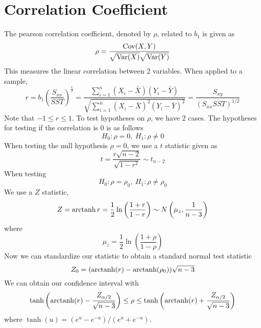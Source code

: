 \section{Correlation Coefficient}

The pearson correlation coefficient, denoted by $\rho$, related to $b_1$ is given as
\[\rho = \frac{\operatorname{Cov}(X,Y)}{\sqrt{\operatorname{Var}(X)}\sqrt{\operatorname{Var}(Y)}}\]
This measures the linear correlation between 2 variables. When applied to a sample, 
\[r = b_1\left(\frac{S_{xx}}{SST}\right)^{\frac{1}{2}} = \frac{\sum_{i=1}^n(X_i - \bar{X})(Y_i - \bar{Y})}{\sqrt{\sum_{i=1}^n (X_i - \bar{X})^2(Y_i - \bar{Y})^2}} = \frac{S_{xy}}{(S_{xx}SST)^{1/2}}\]
Note that $-1 \leq r \leq 1$. To test hypotheses on $\rho$, we have 2 cases. The hypotheses for testing if the correlation is 0 is as follows 
\[H_0: \rho = 0, \ H_1: \rho \neq 0\]
When testing the null hypothesis $\rho = 0$, we use a $t$ statistic given as 
\[t = \frac{r\sqrt{n-2}}{\sqrt{1-r^2}} \sim t_{n-2}\]
When testing 
\[H_0: \rho = \rho_0, \ H_1: \rho \neq \rho_0\]
We use a $Z$ statistic, 
\[Z = \operatorname{arctanh} r = \frac{1}{2}\ln \left(\frac{1+r}{1-r}\right) \sim N\left(\mu_z, \frac{1}{n-3}\right)\]
where 
\[\mu_z = \frac{1}{2}\ln\left(\frac{1+\rho}{1 - \rho}\right)\]
Now we can standardize our statistic to obtain a standard normal test statistic
\[Z_0 = (\operatorname{arctanh}(r) - \operatorname{arctanh}(\rho_0))\sqrt{n-3}\]
We can obtain our confidence interval with 
\[\tanh\left(\operatorname{arctanh}(r) - \frac{Z_{\alpha/2}}{\sqrt{n-3}}\right) \leq \rho \leq \tanh\left(\operatorname{arctanh}(r) + \frac{Z_{\alpha/2}}{\sqrt{n-3}}\right)\]
where $\tanh(u) = (e^u-e^{-u})/(e^u + e^{-u})$.